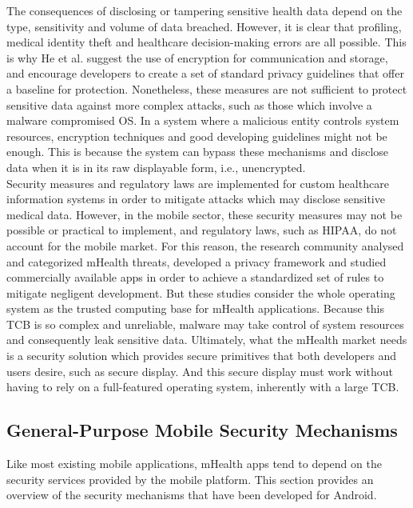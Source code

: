 The consequences of disclosing or tampering sensitive health data depend on the type, sensitivity and volume of data breached. However, it is clear that profiling, medical identity theft and healthcare decision-making errors are all possible. This is why He et al. suggest the use of encryption for communication and storage, and encourage developers to create a set of standard privacy guidelines that offer a baseline for protection. Nonetheless, these measures are not sufficient to protect sensitive data against more complex attacks, such as those which involve a malware compromised OS. In a system where a malicious entity controls system resources, encryption techniques and good developing guidelines might not be enough. This is because the system can bypass these mechanisms and disclose data when it is in its raw displayable form, i.e., unencrypted.\\

Security measures and regulatory laws are implemented for custom healthcare information systems in order to mitigate attacks which may disclose sensitive medical data. However, in the mobile sector, these security measures may not be possible or practical to implement, and regulatory laws, such as \ac{HIPAA}, do not account for the mobile market. For this reason, the research community analysed and categorized mHealth threats, developed a privacy framework and studied commercially available apps in order to achieve a standardized set of rules to mitigate negligent development. But these studies consider the whole operating system as the trusted computing base for mHealth applications. Because this \ac{TCB} is so complex and unreliable, malware may take control of system resources and consequently leak sensitive data. Ultimately, what the mHealth market needs is a security solution which provides secure primitives that both developers and users desire, such as secure display. And this secure display must work without having to rely on a full-featured operating system, inherently with a large \ac{TCB}.

\subsection{General-Purpose Mobile Security Mechanisms}

Like most existing mobile applications, mHealth apps tend to depend on the security services provided by the mobile platform. This section provides an overview of the security mechanisms that have been developed for Android.

